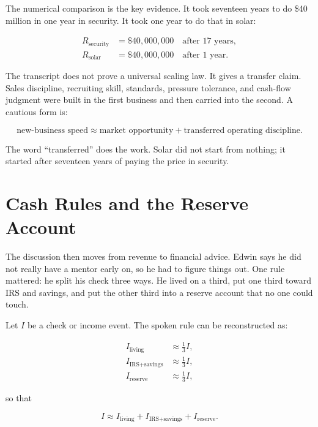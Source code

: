 The numerical comparison is the key evidence. It took seventeen years to do \$40 million in one year in security. It took one year to do that in solar:

\begin{align}
R_{\text{security}} &= \$40{,}000{,}000
\quad \text{after }17\text{ years},\\
R_{\text{solar}} &= \$40{,}000{,}000
\quad \text{after }1\text{ year}.
\end{align}

The transcript does not prove a universal scaling law. It gives a transfer claim. Sales discipline, recruiting skill, standards, pressure tolerance, and cash-flow judgment were built in the first business and then carried into the second. A cautious form is:

\begin{equation}
\text{new-business speed}
\approx
\text{market opportunity}
+
\text{transferred operating discipline}.
\end{equation}

The word ``transferred'' does the work. Solar did not start from nothing; it started after seventeen years of paying the price in security.

\section{Cash Rules and the Reserve Account}

The discussion then moves from revenue to financial advice. Edwin says he did not really have a mentor early on, so he had to figure things out. One rule mattered: he split his check three ways. He lived on a third, put one third toward IRS and savings, and put the other third into a reserve account that no one could touch.

Let \(I\) be a check or income event. The spoken rule can be reconstructed as:

\begin{align}
I_{\text{living}} &\approx \frac{1}{3}I,\\
I_{\text{IRS+savings}} &\approx \frac{1}{3}I,\\
I_{\text{reserve}} &\approx \frac{1}{3}I,
\end{align}

so that

\begin{equation}
I
\approx
I_{\text{living}}
+
I_{\text{IRS+savings}}
+
I_{\text{reserve}}.
\end{equation}

